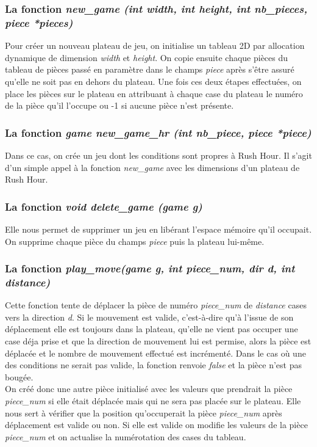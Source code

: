 \documentclass{report}
\begin{document}
\subsubsection{La fonction \textit{new\_game (int width, int height, int nb\_pieces, piece *pieces)}}
Pour créer un nouveau plateau de jeu, on initialise un tableau 2D par allocation dynamique de dimension \textit{width} et \textit{height}. On copie ensuite chaque pièces du tableau de pièces passé en paramètre dans le champs \textit{piece} après s'être assuré qu'elle ne soit pas en dehors du plateau. Une fois ces deux étapes effectuées, on place les pièces sur le plateau en attribuant à chaque case du plateau le numéro de la pièce qu'il l'occupe ou -1 si aucune pièce n'est présente.
\subsubsection{La fonction \textit{game new\_game\_hr (int nb\_piece, piece *piece)}}
Dans ce cas, on crée un jeu dont les conditions sont propres à Rush Hour.
Il s'agit d'un simple appel à la fonction \textit{new\_game} avec les dimensions d'un plateau de Rush Hour.
\subsubsection{La fonction \textit{void delete\_game (game g)}}
Elle nous permet de supprimer un jeu en libérant l'espace mémoire qu'il occupait. On supprime chaque pièce du champs \textit{piece} puis la plateau lui-même.
\subsubsection{La fonction \textit{play\_move(game g, int piece\_num, dir d, int distance)}}
Cette fonction tente de déplacer la pièce de numéro \textit{piece\_num} de \textit{distance} cases vers la direction \textit{d}. Si le mouvement est valide, c'est-à-dire qu'à l'issue de son déplacement elle est toujours dans la plateau, qu'elle ne vient pas occuper une case déja prise et que la direction de mouvement lui est permise, alors la pièce est déplacée et le nombre de mouvement effectué est incrémenté. Dans le cas où une des conditions ne serait pas valide, la fonction renvoie \textit{false} et la pièce n'est pas bougée.\\
On créé donc une autre pièce initialisé avec les valeurs que prendrait la pièce \textit{piece\_num} si elle était déplacée mais qui ne sera pas placée sur le plateau. Elle nous sert à vérifier que la position qu'occuperait la pièce \textit{piece\_num} après déplacement est valide ou non. Si elle est valide on modifie les valeurs de la pièce \textit{piece\_num} et on actualise la numérotation des cases du tableau.
\end{document}
